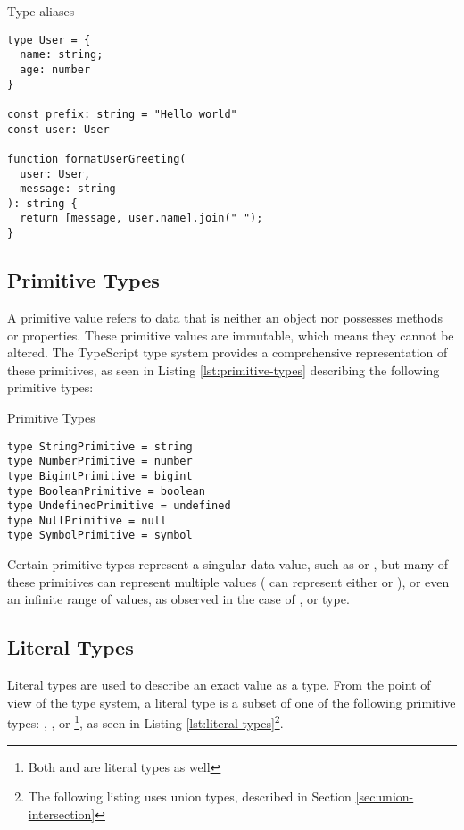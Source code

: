 \begin{listing}[ht]
  \caption{Type aliases}\label{lst:type-aliases}
  \begin{verbatim}
type User = {
  name: string;
  age: number
}

const prefix: string = "Hello world"
const user: User

function formatUserGreeting(
  user: User, 
  message: string
): string {
  return [message, user.name].join(" ");
}
\end{verbatim}
\end{listing}

\subsection{Primitive Types}

A primitive value refers to data that is neither an object nor possesses methods or properties. These primitive values are immutable, which means they cannot be altered. The TypeScript type system provides a comprehensive representation of these primitives, as seen in Listing \ref{lst:primitive-types} describing the following primitive types:

\begin{listing}[ht]
  \caption{Primitive Types}\label{lst:primitive-types}
  \begin{verbatim}
type StringPrimitive = string
type NumberPrimitive = number
type BigintPrimitive = bigint
type BooleanPrimitive = boolean
type UndefinedPrimitive = undefined
type NullPrimitive = null
type SymbolPrimitive = symbol
\end{verbatim}
\end{listing}

Certain primitive types represent a singular data value, such as  or , but many of these primitives can represent multiple values ( can represent either  or ), or even an infinite range of values, as observed in the case of ,  or  type.

\subsection{Literal Types}

Literal types are used to describe an exact value as a type. From the point of view of the type system, a literal type is a subset of one of the following primitive types: , ,  or \footnote{Both  and  are literal types as well}, as seen in Listing \ref{lst:literal-types}\footnote{The following listing uses union types, described in Section \ref{sec:union-intersection}}.

